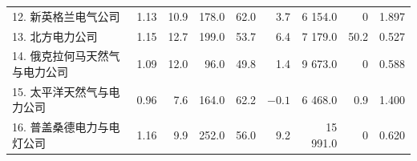 \begin{mvtable}
\begin{tabular}{lrrrrrrrr}
12. 新英格兰电气公司 & 1.13 & 10.9 & 178.0 & 62.0 & 3.7 & 6 154.0 & 0 & 1.897\\
13. 北方电力公司 & 1.15 & 12.7 & 199.0 & 53.7 & 6.4 & 7 179.0 & 50.2 & 0.527\\
14. 俄克拉何马天然气与电力公司 & 1.09 & 12.0 & 96.0 & 49.8 & 1.4 & 9 673.0 & 0 & 0.588\\
15. 太平洋天然气与电力公司 & 0.96 & 7.6 & 164.0 & 62.2 & $-0.1$ & 6 468.0 & 0.9 & 1.400\\
16. 普盖桑德电力与电灯公司 & 1.16 & 9.9 & 252.0 & 56.0 & 9.2 & 15 991.0 & 0 & 0.620\\
\bottomrule
\end{tabular}
\end{mvtable}

